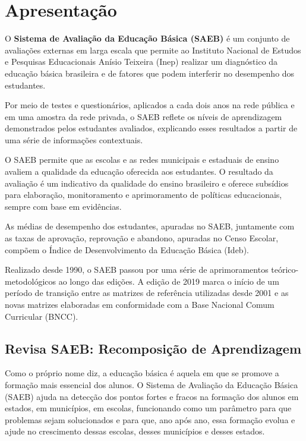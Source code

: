 
\chapter*{Apresentação}

O \textbf{Sistema de Avaliação da Educação Básica (SAEB)} é um conjunto
de avaliações externas em larga escala que permite ao Instituto Nacional
de Estudos e Pesquisas Educacionais Anísio Teixeira (Inep) realizar um
diagnóstico da educação básica brasileira e de fatores que podem
interferir no desempenho dos estudantes.

Por meio de testes e questionários, aplicados a cada dois anos na rede
pública e em uma amostra da rede privada, o SAEB reflete os níveis de
aprendizagem demonstrados pelos estudantes avaliados, explicando esses
resultados a partir de uma série de informações contextuais.

O SAEB permite que as escolas e as redes municipais e estaduais de
ensino avaliem a qualidade da educação oferecida aos estudantes. O
resultado da avaliação é um indicativo da qualidade do ensino brasileiro
e oferece subsídios para elaboração, monitoramento e aprimoramento de
políticas educacionais, sempre com base em evidências.

As médias de desempenho dos estudantes, apuradas no SAEB, juntamente com
as taxas de aprovação, reprovação e abandono, apuradas no Censo Escolar,
compõem o Índice de Desenvolvimento da Educação Básica (Ideb).

Realizado desde 1990, o SAEB passou por uma série de aprimoramentos
teórico-metodológicos ao longo das edições. A edição de 2019 marca o
início de um período de transição entre as matrizes de referência
utilizadas desde 2001 e as novas matrizes elaboradas em conformidade com
a Base Nacional Comum Curricular (BNCC).

\section*{Revisa SAEB: Recomposição de Aprendizagem}

Como o próprio nome diz, a educação básica é aquela em que se promove a
formação mais essencial dos alunos. O Sistema de Avaliação da Educação
Básica (SAEB) ajuda na detecção dos pontos fortes e fracos na formação
dos alunos em estados, em municípios, em escolas, funcionando como um
parâmetro para que problemas sejam solucionados e para que, ano após
ano, essa formação evolua e ajude no crescimento dessas escolas, desses
municípios e desses estados.

